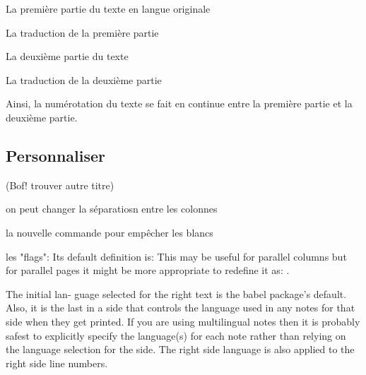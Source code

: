 \begin{latexcode}
\begin{pages}  
    \begin{Leftside}  \beginnumbering 
La première partie du texte en langue originale
 \end{Leftside} %
 
\begin{Rightside} \beginnumbering
La traduction de la première partie
 \end{Rightside} %
 \Pages
 
    \begin{Leftside} \memorydump %
La deuxième partie du texte 
    \endnumbering  \end{Leftside}
    
    \begin{Rightside}  \memorydump %
La traduction de la deuxième partie
    \endnumbering \end{Rightside}   %
 
 \Pages

  \end{pages}
\end{latexcode}

Ainsi, la numérotation du texte se fait en continue entre la première partie et la deuxième partie.







\subsection{Personnaliser}


(Bof! trouver autre titre)



on peut changer la séparatiosn entre les colonnes

la nouvelle commande pour empêcher les blancs

les "flags": Its default definition is: \newcommand*{\Rlineflag}{R} This may be useful for parallel columns but for parallel pages it might be more appropriate to redefine it as:
\renewcommand*{\Rlineflag}{}.

The initial lan- guage selected for the right text is the babel package’s default. Also, it is the last \selectlanguage in a side that controls the language used in any notes for that
side when they get printed. If you are using multilingual notes then it is probably safest to explicitly specify the language(s) for each note rather than relying on the language selection for the side. The right side language is also applied to the right side line numbers.

